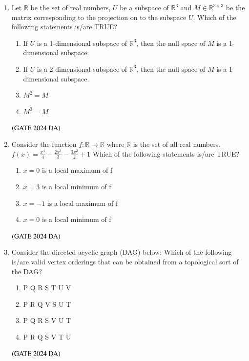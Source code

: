 \documentclass[journal,12pt,onecolumn]{IEEEtran}
\theoremstyle{remark}
\begin{document}
\begin{enumerate}[resume]
\item Let $\mathbb{R}$ be the set of real numbers, $U$ be a subspace of $\mathbb{R}^3$ and $M \in \mathbb{R}^{3 \times 3}$ be the matrix corresponding to the projection on to the subspace $U$. Which of the following statements is/are TRUE?
\begin{enumerate}
\item If $U$ is a 1-dimensional subspace of $\mathbb{R}^3$, then the null space of $M$ is a 1-dimensional subspace.
\item If $U$ is a 2-dimensional subspace of $\mathbb{R}^3$, then the null space of $M$ is a 1-dimensional subspace.
\item $M^2 = M$
\item $M^3 = M$
\end{enumerate}
\hfill $\left(\text{GATE 2024 DA}\right)$


\item Consider the function $f: \mathbb{R} \to \mathbb{R}$ where $\mathbb{R}$ is the set of all real numbers.
$f(x) = \frac{x^4}{4} - \frac{2x^3}{3} - \frac{3x^2}{2} + 1$
Which of the following statements is/are TRUE?
\begin{multicols}{2}
\begin{enumerate}
\item $x = 0$ is a local maximum of f
\item $x = 3$ is a local minimum of f
\item $x = -1$ is a local maximum of f
\item $x = 0$ is a local minimum of f
\end{enumerate}
\end{multicols}
\hfill $\left(\text{GATE 2024 DA}\right)$


\item Consider the directed acyclic graph (DAG) below:
Which of the following is/are valid vertex orderings that can be obtained from a topological sort of the DAG?
\begin{multicols}{4}
\begin{enumerate}
\item P Q R S T U V
\item P R Q V S U T
\item P Q R S V U T
\item P R Q S V T U
\end{enumerate}
\end{multicols}
\hfill $\left(\text{GATE 2024 DA}\right)$



\end{enumerate}
\end{document}
